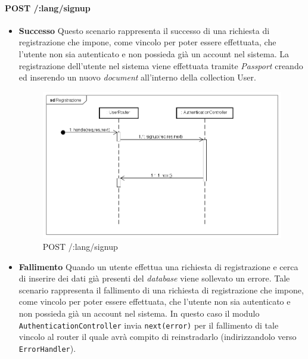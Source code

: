 \paragraph{POST /:lang/signup}
\begin{itemize}
\item \textbf{Successo}
Questo scenario rappresenta il successo di una richiesta di registrazione che impone, come vincolo per poter essere effettuata, che l'utente non sia autenticato e non possieda già un account nel sistema. La registrazione dell'utente nel sistema viene effettuata tramite \textit{Passport} creando ed inserendo un nuovo \textit{document} all'interno della collection User.

\label{Procedura di registrazione}
\begin{figure}[ht]
	\centering
	\includegraphics[scale=0.40]{UML/DiagrammiDiSequenza/Back-end/POST__lang_signup_success.png}
	\caption{POST /:lang/signup}
\end{figure}
\FloatBarrier

\item \textbf{Fallimento}
Quando un utente effettua una richiesta di registrazione e cerca di inserire dei dati già presenti del \textit{database} viene sollevato un errore. Tale scenario rappresenta il fallimento di una richiesta di registrazione che impone, come vincolo per poter essere effettuata, che l'utente non sia autenticato e non possieda già un account nel sistema. In questo caso il modulo \texttt{AuthenticationController} invia \texttt{next(error)} per il fallimento di tale vincolo al router il quale avrà compito di reinstradarlo (indirizzandolo verso \texttt{ErrorHandler}).


\end{itemize}
